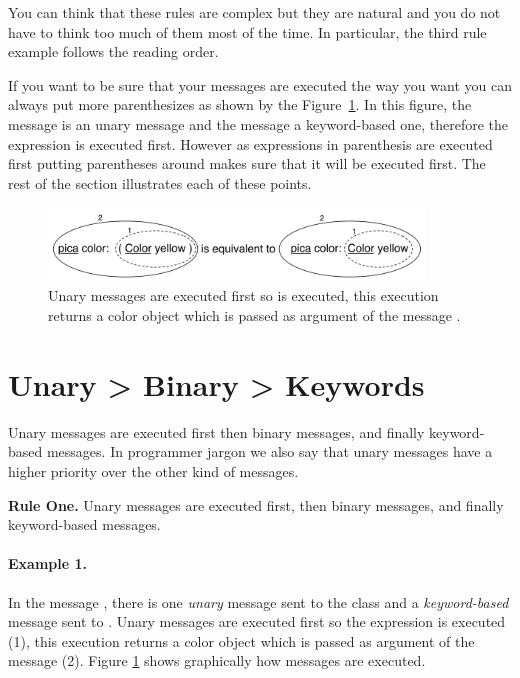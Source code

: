 You can think that these rules are complex but they are natural and you do not have to think too much of them most of the time. In particular, the third rule example follows the reading order. 

If you want to be sure that your messages are executed the way you want you can always put more parenthesizes as shown by the Figure~\ref{fig:ukeyUn}. In this  figure, the message  is an unary message and the message  a keyword-based one, therefore the expression  is executed first. However as expressions in parenthesis are executed first putting parentheses around  makes sure that it will be executed first. The rest of the section illustrates each of  these points.




\begin{figure}[h]
\centerline{\includegraphics[width=10cm]{ukeyUn}} 
\caption{Unary messages are executed first so  is executed, this execution returns a color object which is passed as argument of the message .\label{fig:ukeyUn}}
\end{figure}



\section*{Unary > Binary > Keywords}
Unary messages are executed first then binary messages, and finally keyword-based messages. In programmer jargon we also say that unary messages have a higher  priority over the other kind of messages.


\begin{largecadre}
{\textbf{Rule One.} Unary messages are executed first, then binary messages, and finally keyword-based messages.}
\end{largecadre}

\paragraph{Example 1.}
In the message , there is one \emph{unary} message  sent to the class  and a \emph{keyword-based} message  sent to \ct{\caro}.  Unary messages are executed first so the expression  is executed (1), this execution returns a color object which is passed as argument of the message  (2). Figure \ref{fig:ukeyUn} shows graphically how messages are executed.

